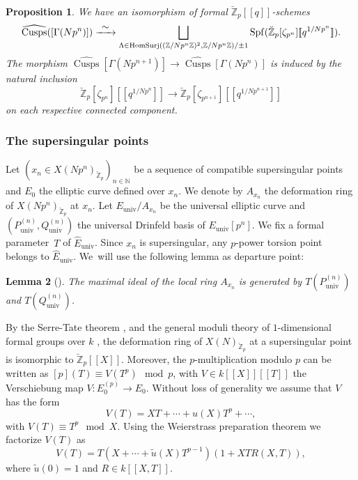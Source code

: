 \documentclass[11pt]{article}
\newcommand\To[1]{\mathchoice{\xrightarrow{\textstyle\kern4pt#1\kern3pt}}{\stackrel{#1}{\to}}{}{}}
\newcommand{\lcr}{[\![}
\newcommand{\rcr}{]\!]}
\newcommand{\univ}{\mathrm{univ}}
\numberwithin{equation}{section}
\newtheorem{prop}{Proposition}[section]
\newtheorem{lem}[prop]{Lemma}
\theoremstyle{definition}
\newcommand{\bb}[1]{\mathbb{#1}}
\DeclareMathOperator{\Spf}{Spf}
\DeclareMathOperator{\Cusps}{Cusps}
\DeclareMathOperator{\HomSurj}{HomSurj}
\newcommand{\mc}[1]{X(Np^{#1})}
\begin{document}
\begin{prop}
\label{Theorem structure cusps 2}
We have an isomorphism of formal $\breve{\bb{Z}}_p\lcr q\rcr$-schemes
\begin{equation*}
\widehat{\Cusps}(\left[\Gamma(Np^n)\right]) \To{\sim} \displaystyle\bigsqcup_{\Lambda\in \HomSurj((\bb{Z}/Np^n\bb{Z})^2,\bb{Z}/Np^n\bb{Z})/\pm 1} \Spf (\breve{\bb{Z}}_p[\zeta_{p^n}]\lcr q^{1/Np^n}\rcr).
\end{equation*}
The morphism $\widehat{\Cusps}[\Gamma(Np^{n+1})]\to \widehat{\Cusps}[\Gamma(Np^n)]$ is induced by the natural inclusion
\[
\breve{\bb{Z}}_p[\zeta_{p^n}]\lcr q^{1/Np^{n}}\rcr\to \breve{\bb{Z}}_p[\zeta_{p^{n+1}}]\lcr q^{1/Np^{n+1}}\rcr
\]
on each respective connected component.
\end{prop}

\subsubsection*{The supersingular points}

Let $(x_n\in \mc{n}_{\breve{\bb{Z}}_p})_{n\in \bb{N}}$ be a sequence of compatible supersingular points and $E_0$ the elliptic curve defined over $x_n$. We denote by $A_{x_n}$ the deformation ring of $X(Np^n)_{\breve{\bb{Z}}_p}$ at $x_n$. Let $E_{\univ}/A_{x_n}$ be the universal elliptic curve and $(P^{(n)}_{\univ},Q^{(n)}_{\univ})$ the universal Drinfeld basis of $E_{\univ}[p^n]$. We fix a formal parameter~$T$ of $\widehat{E}_{\univ}$. Since $x_n$ is supersingular, any $p$-power torsion point belongs to $\widehat{E}_{\univ}$. We~will use the following lemma as departure point:

\begin{lem}[{\cite[Th.\,5.3.2]{katz1985arithmetic}}]
\label{Lemma generators max ideal}
The maximal ideal of the local ring $A_{x_n}$ is generated by $T(P^{(n)}_{\univ})$ and $T(Q^{(n)}_{\univ})$.
\end{lem}

By the Serre-Tate theorem \cite[Th.\,1.2.1]{katz1981serre}, and the general moduli theory of $1$-dimensional formal groups over $k$ \cite{MR238854}, the deformation ring of $X(N)_{\breve{\bb{Z}}_p}$ at a supersingular point is isomorphic to $\breve{\bb{Z}}_p\lcr X\rcr$. Moreover, the $p$-multiplication modulo $p$ can be written as $[p](T)\equiv V(T^p) \mod p$, with $V\in k\lcr X\rcr\lcr T\rcr$ the Verschiebung map $V: E_0^{(p)}\to E_0$. Without loss of generality we assume that $V$ has the form
\[
V(T)= XT+\cdots+ u(X)T^p+\cdots,
\]
with $V(T)\equiv T^p \mod X$. Using the Weierstrass preparation theorem we factorize $V(T)$ as
\begin{equation}
\label{verschpowerseries}
V(T)=T(X+\cdots +\tilde{u}(X)T^{p-1})(1+XT R(X,T)),
\end{equation}
where $\tilde{u}(0)=1$ and $R\in k\lcr X,T\rcr$.
\end{document}
